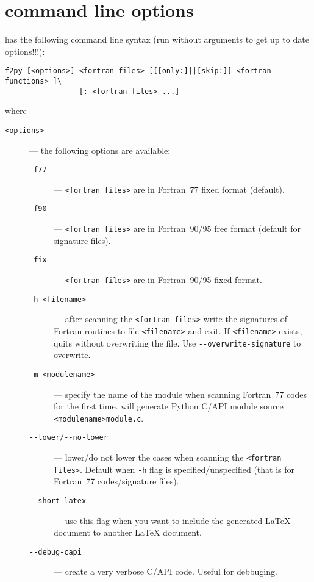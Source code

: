 
\section{\fpy command line options}
\label{sec:opts}

\fpy has the following command line syntax (run \fpy without arguments
to get up to date options!!!):
\begin{verbatim}
f2py [<options>] <fortran files> [[[only:]||[skip:]] <fortran functions> ]\
                 [: <fortran files> ...]
\end{verbatim}
where 
\begin{description}
\item[\texttt{<options>}] --- the following options are available:
  \begin{description}
  \item[\texttt{-f77}]  --- \texttt{<fortran files>} are in Fortran~77
    fixed format (default).
  \item[\texttt{-f90}]  --- \texttt{<fortran files>} are in
    Fortran~90/95 free format (default for signature files).
  \item[\texttt{-fix}] --- \texttt{<fortran files>} are in
    Fortran~90/95 fixed format.
  \item[\texttt{-h <filename>}] --- after scanning the
    \texttt{<fortran files>} write the signatures of Fortran routines
    to file \texttt{<filename>} and exit. If \texttt{<filename>}
    exists, \fpy quits without overwriting the file. Use
    \texttt{-{}-overwrite-signature} to overwrite.
  \item[\texttt{-m <modulename>}] --- specify the name of the module
    when scanning Fortran~77 codes for the first time. \fpy will
    generate Python C/API module source \texttt{<modulename>module.c}.
  \item[\texttt{-{}-lower/-{}-no-lower}]  --- lower/do not lower the cases
    when scanning the \texttt{<fortran files>}. Default when
    \texttt{-h} flag is specified/unspecified (that is for Fortran~77
    codes/signature files).
  \item[\texttt{-{}-short-latex}] --- use this flag when you want to
    include the generated LaTeX document to another LaTeX document.
  \item[\texttt{-{}-debug-capi}] --- create a very verbose C/API
    code. Useful for debbuging.

\end{description}
\end{description}
